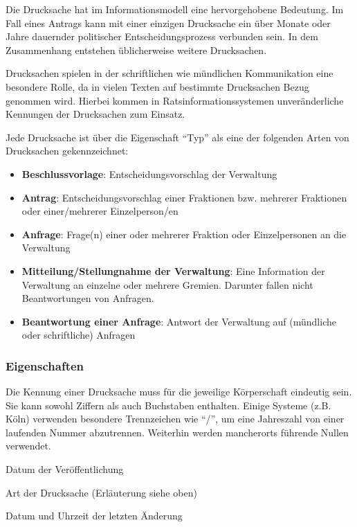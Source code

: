 \documentclass[,a4paper]{article}
\begin{document}
Die Drucksache hat im Informationsmodell eine hervorgehobene Bedeutung.
Im Fall eines Antrags kann mit einer einzigen Drucksache ein über Monate
oder Jahre dauernder politischer Entscheidungsprozess verbunden sein. In
dem Zusammenhang entstehen üblicherweise weitere Drucksachen.

Drucksachen spielen in der schriftlichen wie mündlichen Kommunikation
eine besondere Rolle, da in vielen Texten auf bestimmte Drucksachen
Bezug genommen wird. Hierbei kommen in Ratsinformationssystemen
unveränderliche Kennungen der Drucksachen zum Einsatz.

Jede Drucksache ist über die Eigenschaft ``Typ'' als eine der folgenden
Arten von Drucksachen gekennzeichnet:

\begin{itemize}
\itemsep1pt\parskip0pt
\item
  \textbf{Beschlussvorlage}: Entscheidungsvorschlag der Verwaltung
\item
  \textbf{Antrag}: Entscheidungsvorschlag einer Fraktionen bzw. mehrerer
  Fraktionen oder einer/mehrerer Einzelperson/en
\item
  \textbf{Anfrage}: Frage(n) einer oder mehrerer Fraktion oder
  Einzelpersonen an die Verwaltung
\item
  \textbf{Mitteilung/Stellungnahme der Verwaltung}: Eine Information der
  Verwaltung an einzelne oder mehrere Gremien. Darunter fallen nicht
  Beantwortungen von Anfragen.
\item
  \textbf{Beantwortung einer Anfrage}: Antwort der Verwaltung auf
  (mündliche oder schriftliche) Anfragen
\end{itemize}

\subsubsection{Eigenschaften}\label{eigenschaften-6}

\begin{description}
\itemsep1pt\parskip0pt
\item[Schlüssel (\texttt{id})]
Die Kennung einer Drucksache muss für die jeweilige Körperschaft
eindeutig sein. Sie kann sowohl Ziffern als auch Buchstaben enthalten.
Einige Systeme (z.B. Köln) verwenden besondere Trennzeichen wie ``/'',
um eine Jahreszahl von einer laufenden Nummer abzutrennen. Weiterhin
werden mancherorts führende Nullen verwendet.
\item[Datum (\texttt{date})]
Datum der Veröffentlichung
\item[Typ (\texttt{type})]
Art der Drucksache (Erläuterung siehe oben)
\item[Zuletzt geändert (\texttt{last\_modified})]
Datum und Uhrzeit der letzten Änderung
\end{description}
\end{document}
